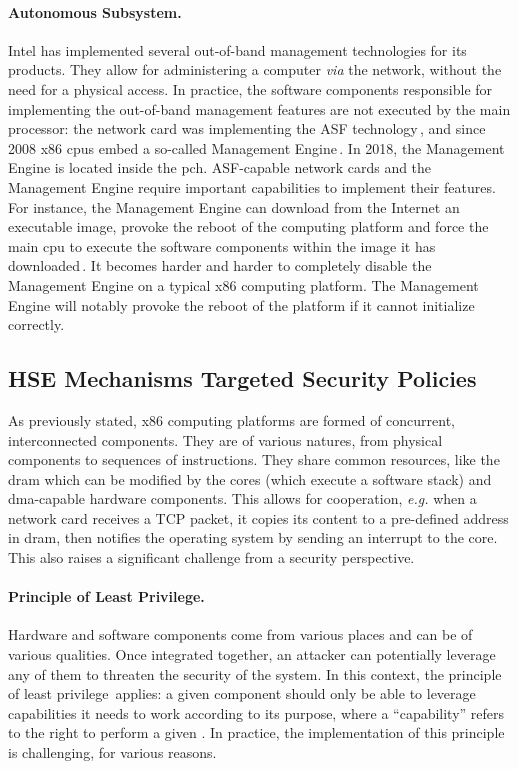 \paragraph{Autonomous Subsystem.}
%
Intel has implemented several out-of-band management technologies for
its products.
%
They allow for administering a computer \emph{via} the network, without the need
for a physical access.
%
In practice, the software components responsible for implementing the
out-of-band management features are not executed by the main processor: the
network card was implementing the ASF technology\,\cite{duflot2010network}, and
since 2008 x86 \acp{cpu} embed a so-called Management
Engine\,\cite{ruan2014me,skochinsky2014intel}.
%
In 2018, the Management Engine is located inside the \ac{pch}.
%
ASF-capable network cards and the Management Engine require important
capabilities to implement their features.
%
For instance, the Management Engine can download from the Internet an executable
image, provoke the reboot of the computing platform and force the main \ac{cpu}
to execute the software components within the image it has
downloaded\,\cite{kumar2009active}.
%
It becomes harder and harder to completely disable the Management Engine on a
typical x86 computing platform.
%
The Management Engine will notably provoke the reboot of the platform if it
cannot initialize correctly.

\subsection{HSE Mechanisms Targeted Security Policies}
\label{subsec:usecase:targetedsec}

As previously stated, x86 computing platforms are formed of concurrent,
interconnected components.
%
They are of various natures, from physical components to sequences of
instructions.
%
They share common resources, like the \ac{dram} which can be modified by the
cores (which execute a software stack) and \ac{dma}-capable hardware components.
%
This allows for cooperation, \emph{e.g.} when a network card receives a TCP
packet, it copies its content to a pre-defined address in \ac{dram}, then
notifies the operating system by sending an interrupt to the core.
%
This also raises a significant challenge from a security perspective.

\paragraph{Principle of Least Privilege.}
%
Hardware and software components come from various places and can be of various
qualities.
%
Once integrated together, an attacker can potentially leverage any of them to
threaten the security of the system.
%
In this context, the principle of least
privilege\,\cite{saltzer1975leastprivilege} applies: a given component should
only be able to leverage capabilities it needs to work according to its purpose,
where a ``capability'' refers to the right to perform a given \IO.
%
In practice, the implementation of this principle is challenging, for various
reasons.

